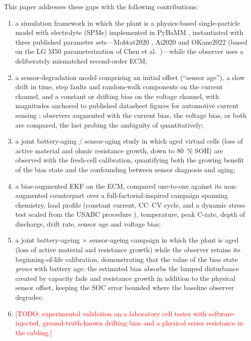 \documentclass[11pt,a4paper]{article}
\newcommand{\todo}[1]{\textcolor{red}{[TODO: #1]}}
\begin{document}
This paper addresses these gaps with the following contributions:
\begin{enumerate}
  \item a simulation framework in which the plant is a physics-based
        single-particle model with electrolyte (SPMe) implemented in PyBaMM
        \citep{sulzer2021pybamm}, instantiated with three published
        parameter sets---Mohtat2020 \citep{mohtat2020}, Ai2020
        \citep{ai2020} and OKane2022 \citep{okane2022} (based on the LG M50
        parameterization of Chen et al.\ \citep{chen2020})---while the
        observer uses a deliberately mismatched second-order ECM;
  \item a sensor-degradation model comprising an initial offset (``sensor
        age''), a slow drift in time, step faults and random-walk
        components on the current channel, and a constant or drifting bias
        on the voltage channel, with magnitudes anchored to published
        datasheet figures for automotive current sensing
        \citep{melexis2023shunt}; observers augmented with the current
        bias, the voltage bias, or both are compared, the last probing the
        ambiguity of \citep{zhao2017observability} quantitatively;
  \item a joint battery-aging / sensor-aging study in which aged virtual
        cells (loss of active material and ohmic resistance growth, down to
        \SI{80}{\percent} SOH) are observed with the fresh-cell
        calibration, quantifying both the growing benefit of the bias state
        and the confounding between sensor diagnosis and aging;
  \item a bias-augmented EKF on the ECM, compared one-to-one against its
        non-augmented counterpart over a full-factorial-inspired campaign
        spanning chemistry, load profile (constant current, CC--CV cycle,
        and a dynamic stress test scaled from the USABC procedure
        \citep{usabc1996}), temperature, peak C-rate, depth of discharge,
        drift rate, sensor age and voltage bias;
  \item a joint battery-ageing $\times$ sensor-ageing campaign in which
        the plant is aged (loss of active material and resistance growth)
        while the observer retains its beginning-of-life calibration,
        demonstrating that the value of the bias state \emph{grows} with
        battery age: the estimated bias absorbs the lumped disturbance
        created by capacity fade and resistance growth in addition to the
        physical sensor offset, keeping the SOC error bounded where the
        baseline observer degrades;
  \item \todo{experimental validation on a laboratory cell tester with
        software-injected, ground-truth-known drifting bias and a physical
        series resistance in the cabling.}
\end{enumerate}
\end{document}
